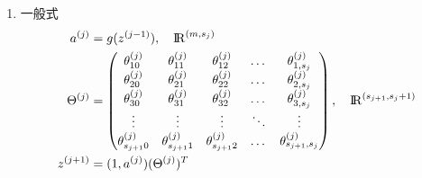 \begin{enumerate}
\item 一般式
\begin{equation}\begin{aligned}
	a^{(j)} &= g(z^{(j-1)}), \quad {\rm I\!R}^{(m,s_j)} \\
	\Theta^{(j)} &= 
		\left(\begin{matrix}
			\theta_{10}^{(j)} & \theta_{11}^{(j)} & \theta_{12}^{(j)} & \dots & \theta_{1,s_{j}}^{(j)} \\
			\theta_{20}^{(j)} & \theta_{21}^{(j)} & \theta_{22}^{(j)} & \dots & \theta_{2,s_{j}}^{(j)} \\
			\theta_{30}^{(j)} & \theta_{31}^{(j)} & \theta_{32}^{(j)} & \dots & \theta_{3,s_{j}}^{(j)} \\
			\vdots    & \vdots    & \vdots    & \ddots & \vdots   \\
			\theta_{s_{j+1}0}^{(j)} & \theta_{s_{j+1}1}^{(j)} & \theta_{s_{j+1}2}^{(j)} & \dots & \theta_{s_{j+1},s_{j}}^{(j)}
		\end{matrix}\right), \quad {\rm I\!R}^{(s_{j+1},s_{j}+1)}\\
	z^{(j+1)} &= (1, a^{(j)}) (\Theta^{(j)})^T \\

\end{aligned}
\end{equation}
\end{enumerate}
